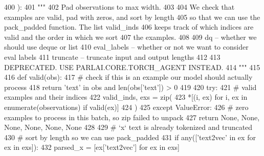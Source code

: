 \begin{DoxyCode}
400     ):
401         \textcolor{stringliteral}{"""}
402 \textcolor{stringliteral}{        Pad observations to max width.}
403 \textcolor{stringliteral}{}
404 \textcolor{stringliteral}{        We check that examples are valid, pad with zeros, and sort by length}
405 \textcolor{stringliteral}{        so that we can use the pack\_padded function. The list valid\_inds}
406 \textcolor{stringliteral}{        keeps track of which indices are valid and the order in which we sort}
407 \textcolor{stringliteral}{        the examples.}
408 \textcolor{stringliteral}{}
409 \textcolor{stringliteral}{        dq -- whether we should use deque or list}
410 \textcolor{stringliteral}{        eval\_labels -- whether or not we want to consider eval labels}
411 \textcolor{stringliteral}{        truncate -- truncate input and output lengths}
412 \textcolor{stringliteral}{}
413 \textcolor{stringliteral}{        DEPRECATED. USE PARLAI.CORE.TORCH\_AGENT INSTEAD.}
414 \textcolor{stringliteral}{        """}
415 
416         \textcolor{keyword}{def }valid(obs):
417             \textcolor{comment}{# check if this is an example our model should actually process}
418             \textcolor{keywordflow}{return} \textcolor{stringliteral}{'text'} \textcolor{keywordflow}{in} obs \textcolor{keywordflow}{and} len(obs[\textcolor{stringliteral}{'text'}]) > 0
419 
420         \textcolor{keywordflow}{try}:
421             \textcolor{comment}{# valid examples and their indices}
422             valid\_inds, exs = zip(
423                 *[(i, ex) \textcolor{keywordflow}{for} i, ex \textcolor{keywordflow}{in} enumerate(observations) \textcolor{keywordflow}{if} valid(ex)]
424             )
425         \textcolor{keywordflow}{except} ValueError:
426             \textcolor{comment}{# zero examples to process in this batch, so zip failed to unpack}
427             \textcolor{keywordflow}{return} \textcolor{keywordtype}{None}, \textcolor{keywordtype}{None}, \textcolor{keywordtype}{None}, \textcolor{keywordtype}{None}, \textcolor{keywordtype}{None}, \textcolor{keywordtype}{None}
428 
429         \textcolor{comment}{# `x` text is already tokenized and truncated}
430         \textcolor{comment}{# sort by length so we can use pack\_padded}
431         \textcolor{keywordflow}{if} any([\textcolor{stringliteral}{'text2vec'} \textcolor{keywordflow}{in} ex \textcolor{keywordflow}{for} ex \textcolor{keywordflow}{in} exs]):
432             parsed\_x = [ex[\textcolor{stringliteral}{'text2vec'}] \textcolor{keywordflow}{for} ex \textcolor{keywordflow}{in} exs]

\end{DoxyCode}
